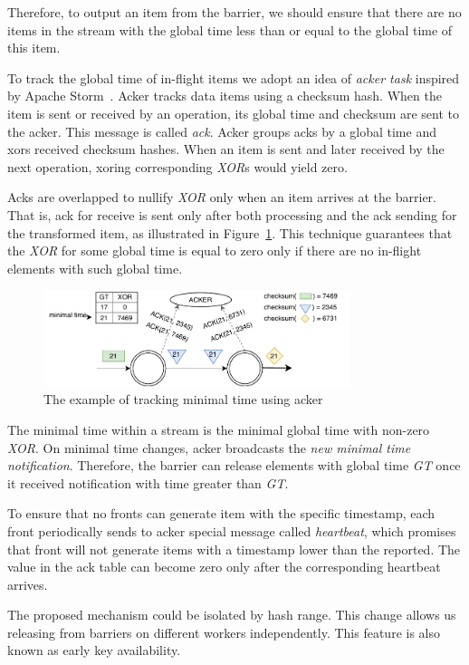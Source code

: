 Therefore, to output an item from the barrier, we should ensure that there are no items in the stream with the global time less than or equal to the global time of this item.

To track the global time of in-flight items we adopt an idea of {\it acker task} inspired by Apache Storm~\cite{apache:storm}. Acker tracks data items using a checksum hash. When the item is sent or received by an operation, its global time and checksum are sent to the acker. This message is called {\it ack}. Acker groups acks by a global time and xors received checksum hashes. When an item is sent and later received by the next operation, xoring corresponding {\it XOR}s would yield zero.

Acks are overlapped to nullify {\it XOR} only when an item arrives at the barrier. That is, ack for receive is sent only after both processing and the ack sending for the transformed item, as illustrated in Figure~\ref{acker}. This technique guarantees that the {\it XOR} for some global time is equal to zero only if there are no in-flight elements with such global time.

\begin{figure}[ht]
  \centering
  \includegraphics[width=0.8\textwidth]{pics/acker}
  \caption{The example of tracking minimal time using acker}
  \label {acker}
\end{figure}

The minimal time within a stream is the minimal global time with non-zero {\it XOR}. On minimal time changes, acker broadcasts the {\it new minimal time notification}. Therefore, the barrier can release elements with global time {\it GT} once it received notification with time greater than {\it GT}.

To ensure that no fronts can generate item with the specific timestamp, each front periodically sends to acker special message called {\it heartbeat}, which promises that front will not generate items with a timestamp lower than the reported. The value in the ack table can become zero only after the corresponding heartbeat arrives.

The proposed mechanism could be isolated by hash range. This change allows us releasing from barriers on different workers independently. This feature is also known as early key availability.
